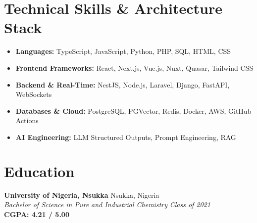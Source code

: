 \documentclass[10pt,a4paper]{article}
\begin{document}
\section{Technical Skills \& Architecture Stack}
\noindent
\begin{minipage}[t]{0.45\textwidth}
\vspace{0pt}
\begin{itemize}[label=\raisebox{0.25ex}{\tiny$\bullet$}]
  \item \textbf{Languages:} TypeScript, JavaScript, Python, PHP, SQL, HTML, CSS
  \item \textbf{Frontend Frameworks:} React, Next.js, Vue.js, Nuxt, Quasar, Tailwind CSS
  \item \textbf{Backend \& Real-Time:} NestJS, Node.js, Laravel, Django, FastAPI, WebSockets
  \item \textbf{Databases \& Cloud:} PostgreSQL, PGVector, Redis, Docker, AWS, GitHub Actions
  \item \textbf{AI Engineering:} LLM Structured Outputs, Prompt Engineering, RAG
\end{itemize}
\end{minipage}
\hfill
\begin{minipage}[t]{0.50\textwidth}
\vspace{-15pt}
\begin{center}
\end{center}
\end{minipage}

\vspace{10pt}

\section{Education}
\noindent
\textbf{University of Nigeria, Nsukka} \hfill Nsukka, Nigeria \\
\textit{Bachelor of Science in Pure and Industrial Chemistry} \hfill \textit{Class of 2021} \\
\textbf{CGPA: 4.21 / 5.00}
\end{document}
